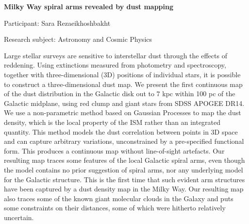 \begin{minipage}[t]{1.0\textwidth}

\begin{center}

{{\large\bfseries Milky Way spiral arms revealed by dust mapping}\par}

\end{center}

{\noindent Participant: Sara Rezaeikhoshbakht\par} 

{\noindent Research subject: Astronomy and Cosmic Physics\par}\medskip

\noindent Large stellar surveys are sensitive to interstellar dust through the effects of reddening. Using extinctions measured from photometry and spectroscopy, together with three-dimensional (3D) positions of individual stars, it is possible to construct a three-dimensional dust map. We present the first continuous map of the dust distribution in the Galactic disk out to 7 kpc within 100 pc of the Galactic midplane, using red clump and giant stars from SDSS APOGEE DR14. We use a non-parametric method based on Gaussian Processes to map the dust density, which is the local property of the ISM rather than an integrated quantity. This method models the dust correlation between points in 3D space and can capture arbitrary variations, unconstrained by a pre-specified functional form. This produces a continuous map without line-of-sight artefacts. Our resulting map traces some features of the local Galactic spiral arms, even though the model contains no prior suggestion of spiral arms, nor any underlying model for the Galactic structure. This is the first time that such evident arm structures have been captured by a dust density map in the Milky Way. Our resulting map also traces some of the known giant molecular clouds in the Galaxy and puts some constraints on their distances, some of which were hitherto relatively uncertain.\par\end{minipage}

\hfill 

